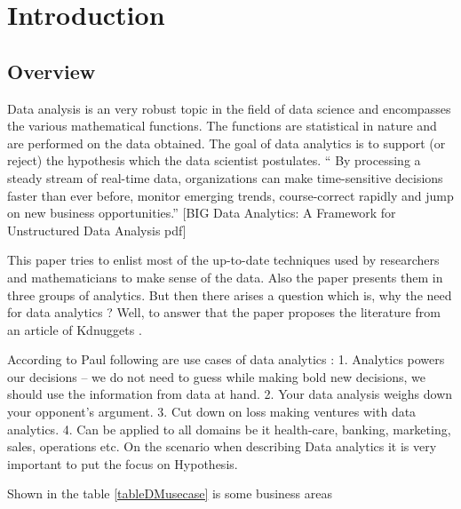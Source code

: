 \setlength{\footskip}{8mm}

\chapter{Introduction}


\section{Overview}

Data analysis is an very robust topic in the field of data science and encompasses the various mathematical functions. The functions are statistical in nature and are performed on the data obtained. The goal of data analytics is to support (or reject) the hypothesis which the data scientist postulates.
“ By processing a steady stream of real-time data, organizations can make time-sensitive decisions faster than ever before, monitor emerging trends, course-correct rapidly and jump on new business opportunities.” [BIG Data Analytics: A Framework for Unstructured Data Analysis pdf]

This paper tries to enlist most of the up-to-date techniques used by researchers and mathematicians to make sense of the data. Also the paper presents them in three groups of analytics.
But then there arises a question which is, why the need for data analytics ? Well, to answer that the paper proposes the literature from an article of Kdnuggets .

According to Paul following are use cases  of data analytics :
1. Analytics powers our decisions – we do not need to guess while making bold new decisions, we should use the information from data at hand.
2. Your data analysis weighs down your opponent's argument.
3. Cut down on loss making ventures with data analytics.
4. Can be applied to all domains be it health-care, banking, marketing, sales, operations etc.
On the scenario when describing Data analytics it is very important to put the focus on Hypothesis.

Shown in the table \ref{tableDMusecase} is some business areas 


